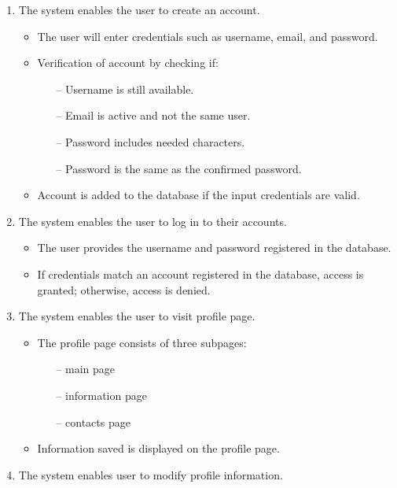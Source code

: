 \begin{enumerate}
	\item The system enables the user to create an account.
	
	\begin{itemize}
		\item The user will enter credentials such as username, email, and password.
		\item Verification of account by checking if:
			\begin{itemize}
			\item [--] Username is still available.
			\item [--] Email is active and not the same user.
			\item [--] Password includes needed characters.
			\item [--] Password is the same as the confirmed password.
			\end{itemize}
		\item Account is added to the database if the input credentials are valid. 
	\end{itemize}
	
	\item The system enables the user to log in to their accounts. 
	
	\begin{itemize}
		\item The user provides the username and password registered in the database.
		\item If credentials match an account registered in the database, access is granted; otherwise, access is denied.
	\end{itemize}

	\item The system enables the user to visit profile page.
	
		\begin{itemize}
			\item The profile page consists of three subpages:
			\begin{itemize}
				\item [--] main page
				\item [--] information page
				\item [--] contacts page
			\end{itemize}
			\item Information saved is displayed on the profile page.
		
		\end{itemize}
	\item The system enables user to modify profile information.
		

\end{enumerate}
